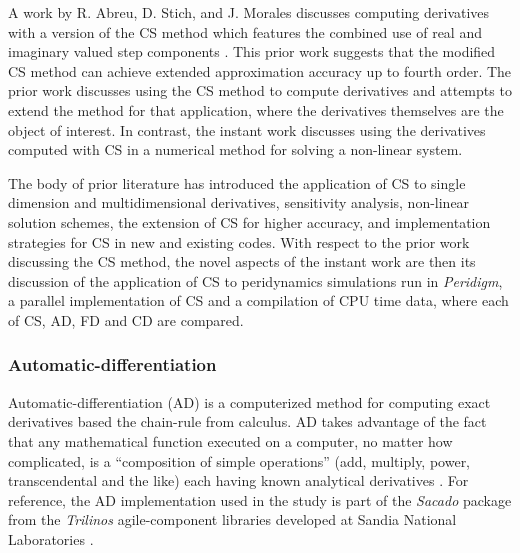\documentclass[preprint,12pt]{elsarticle}
\begin{document}
A work by R. Abreu, D. Stich, and J. Morales discusses computing derivatives
with a version of the CS method which features the combined use
of real and imaginary valued step components \cite{abreu2013generalization}.
This prior work suggests that the modified CS method can achieve extended
approximation accuracy up to fourth order.  The prior work discusses using the
CS method to compute derivatives and attempts to extend the method for that
application, where the derivatives themselves are the object of interest. In
contrast, the instant work discusses using the derivatives computed with CS in
a numerical method for solving a non-linear system.

The body of prior literature has introduced the application of CS to
single dimension and multidimensional derivatives, sensitivity analysis,
non-linear solution schemes, the extension of CS for higher accuracy, 
and implementation strategies for CS in new and existing codes.
With respect to the prior work discussing the CS method, the novel
aspects of the instant work are then its discussion of the application of CS to
peridynamics simulations run in \emph{Peridigm}, a parallel implementation of
CS and a compilation of CPU time data, where each of CS, AD, FD and CD are
compared. 

\subsubsection{Automatic-differentiation} 
\label{ADsubsection}

Automatic-differentiation (AD) is a computerized method for computing exact
derivatives based the chain-rule from calculus. AD takes advantage of the fact
that any mathematical function executed on a computer, no matter how
complicated, is a ``composition of simple operations'' (add, multiply, power,
transcendental and the like) each having known analytical derivatives
\cite{ref-sacado-presentation}. For reference, the AD implementation used in
the study is part of the \emph{Sacado} package from the \emph{Trilinos}
agile-component libraries developed at Sandia National Laboratories
\cite{ref-Sacado}.
\end{document}
